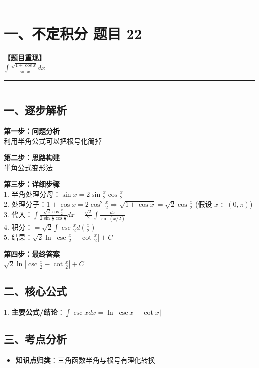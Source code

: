 ﻿\documentclass[12pt, a4paper]{ctexart}
\newcommand{\TopSeparator}{
    \par\noindent\rule{\textwidth}{1.5pt}\vspace{0.5em}
}
\newcommand{\AnalysisSeparator}{
    \par\noindent\rule{\textwidth}{0.5pt}\vspace{0.2em}\hrule\vspace{0.5em}
}
\newenvironment{RedAnalysis}{
    \par
    \color{red} 
}{
    \par
    \color{black} 
}
\begin{document}
\vspace{2em}

\TopSeparator
\section*{一、不定积分 题目 22}

\textbf{【题目重现】} \\
$\int \frac{\sqrt{1+\cos x}}{\sin x} dx$

\AnalysisSeparator

\begin{RedAnalysis}

	\subsection*{一、逐步解析}

	\textbf{第一步：问题分析} \\
	利用半角公式可以把根号化简掉

	\textbf{第二步：思路构建} \\
	半角公式变形法

	\textbf{第三步：详细步骤} \\
	1. 半角处理分母：$\sin x = 2\sin\frac{x}{2}\cos\frac{x}{2}$ \\ 
	2. 处理分子：$1+\cos x = 2\cos^2\frac{x}{2} \Rightarrow \sqrt{1+\cos x} = \sqrt{2}\cos\frac{x}{2}$ (假设 $x \in (0,\pi)$) \\ 
	3. 代入：$\int \frac{\sqrt{2}\cos\frac{x}{2}}{2\sin\frac{x}{2}\cos\frac{x}{2}} dx = \frac{\sqrt{2}}{2} \int \frac{dx}{\sin(x/2)}$ \\ 
	4. 积分：$=\sqrt{2} \int \csc\frac{x}{2} d(\frac{x}{2})$ \\ 
	5. 结果：$\sqrt{2} \ln |\csc\frac{x}{2} - \cot\frac{x}{2}| + C$

	\textbf{第四步：最终答案} \\
	$\sqrt{2} \ln \left| \csc\frac{x}{2} - \cot\frac{x}{2} \right| + C$

	\subsection*{二、核心公式}
	1. \textbf{主要公式/结论}：$\int \csc x dx = \ln|\csc x - \cot x|$

	\subsection*{三、考点分析}
	\begin{itemize}
		\item \textbf{知识点归类}：三角函数半角与根号有理化转换
	\end{itemize}

\end{RedAnalysis}
\end{document}
